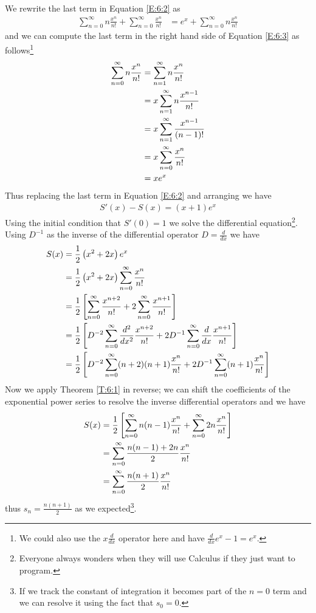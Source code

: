 \documentclass[oneside,12pt]{book}   	%
\newcounter{ex}
\newcounter{pr}
\theoremstyle{definition}
\begin{document}
\begin{spacing}{1.618}
			We rewrite the last term in Equation \ref{E:6:2} as 
			\begin{alignat}{4}
				\sum_{n=0}^\infty n\frac{x^n}{n!} + \sum_{n=0}^\infty \frac{x^n}{n!}&=e^x + \sum_{n=0}^\infty n\frac{x^n}{n!} \label{E:6:3}
			\end{alignat}
			and we can compute the last term in the right hand side of Equation \ref{E:6:3} as follows\footnote{We could also use the $x\frac{d}{dx}$ operator here and have $\frac{d}{dx}e^x-1=e^x$.}
			\begin{alignat}{4}
				\sum_{n=0}^\infty n\frac{x^n}{n!}&=\sum_{n=1}^\infty n\frac{x^n}{n!} \notag \\
					&=x\sum_{n=1}^\infty n\frac{x^{n-1}}{n!} \notag \\
					&=x\sum_{n=1}^\infty \frac{x^{n-1}}{(n-1)!} \notag \\
					&=x\sum_{n=0}^\infty \frac{x^n}{n!} \notag \\
					&=x e^x
			\end{alignat}
			Thus replacing the last term in Equation \ref{E:6:2} and arranging we have
			\begin{alignat}{4}
				S'(x)-S(x)=(x+1)e^x
			\end{alignat}
			Using the initial condition that $S'(0)=1$ we solve the differential equation\footnote{Everyone always wonders when they will use Calculus if they just want to program.}. Using $D^{-1}$ as the inverse of the differential operator $D=\frac{d}{dx}$ we have 
			\begin{alignat}{4}
				S(x)&=\frac{1}{2}\left(x^2+2x\right)e^x \notag \\
					&=\frac{1}{2}\left(x^2+2x\right)\sum_{n=0}^\infty \frac{x^n}{n!} \notag \\
					&=\frac{1}{2}\left[\sum_{n=0}^\infty \frac{x^{n+2}}{n!} + 2\sum_{n=0}^\infty \frac{x^{n+1}}{n!}\right] \notag \\
					&=\frac{1}{2}\left[D^{-2}\sum_{n=0}^\infty \frac{d^2}{dx^2}\frac{x^{n+2}}{n!} + 2D^{-1}\sum_{n=0}^\infty \frac{d}{dx}\frac{x^{n+1}}{n!}\right] \notag \\
					&=\frac{1}{2}\left[D^{-2}\sum_{n=0}^\infty (n+2)(n+1)\frac{x^n}{n!} + 2D^{-1}\sum_{n=0}^\infty (n+1)\frac{x^n}{n!}\right] \notag
			\end{alignat}
			Now we apply Theorem \ref{T:6:1} in reverse; we can shift the coefficients of the exponential power series to resolve the inverse differential operators and we have
			\begin{alignat}{4}
				S(x)&=\frac{1}{2}\left[\sum_{n=0}^\infty n(n-1)\frac{x^n}{n!} + \sum_{n=0}^\infty 2n\frac{x^n}{n!}\right] \notag \\
					&=\sum_{n=0}^\infty \frac{n(n-1)+2n}{2}\frac{x^n}{n!} \notag \\
					&=\sum_{n=0}^\infty \frac{n(n+1)}{2}\frac{x^n}{n!} \notag 
			\end{alignat}
			thus $s_n=\frac{n(n+1)}{2}$ as we expected\footnote{If we track the constant of integration it becomes part of the $n=0$ term and we can resolve it using the fact that $s_0=0$.}. 

\end{spacing}
\end{document}
